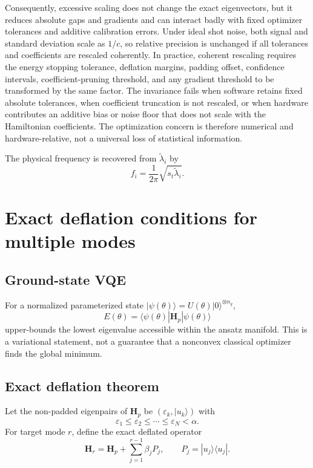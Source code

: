 \documentclass{ieeeaccess}
\newcommand{\Hq}{\mathbf{H}}
\begin{document}
Consequently, excessive scaling does not change the exact eigenvectors, but it reduces absolute gaps and gradients and can interact badly with fixed optimizer tolerances and additive calibration errors. Under ideal shot noise, both signal and standard deviation scale as $1/c$, so relative precision is unchanged if all tolerances and coefficients are rescaled coherently. In practice, coherent rescaling requires the energy stopping tolerance, deflation margins, padding offset, confidence intervals, coefficient-pruning threshold, and any gradient threshold to be transformed by the same factor. The invariance fails when software retains fixed absolute tolerances, when coefficient truncation is not rescaled, or when hardware contributes an additive bias or noise floor that does not scale with the Hamiltonian coefficients. The optimization concern is therefore numerical and hardware-relative, not a universal loss of statistical information.

The physical frequency is recovered from $\widetilde\lambda_i$ by
\begin{equation}
f_i=\frac{1}{2\pi}\sqrt{s_t\widetilde\lambda_i}.
\label{eq:freqrecover}
\end{equation}

\section{Exact deflation conditions for multiple modes}
\label{sec:deflation}

\subsection{Ground-state VQE}

For a normalized parameterized state $|\psi(\theta)\rangle=U(\theta)|0\rangle^{\otimes n_q}$,
\begin{equation}
E(\theta)=\langle\psi(\theta)|\Hq_p|\psi(\theta)\rangle
\label{eq:vqe}
\end{equation}
upper-bounds the lowest eigenvalue accessible within the ansatz manifold. This is a variational statement, not a guarantee that a nonconvex classical optimizer finds the global minimum.

\subsection{Exact deflation theorem}

Let the non-padded eigenpairs of $\Hq_p$ be $(\varepsilon_k,|u_k\rangle)$ with
\begin{equation}
\varepsilon_1\le\varepsilon_2\le\cdots\le\varepsilon_N<\alpha.
\end{equation}
For target mode $r$, define the exact deflated operator
\begin{equation}
\Hq_r=\Hq_p+\sum_{j=1}^{r-1}\beta_jP_j,
\qquad P_j=|u_j\rangle\langle u_j|.
\label{eq:deflatedH}
\end{equation}
\end{document}

